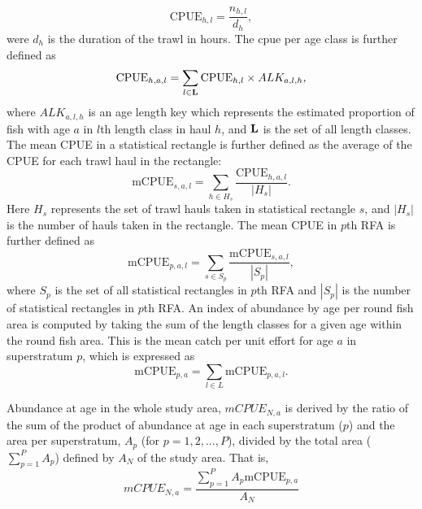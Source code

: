 \documentclass[a4paper 12pt]{article}
\numberwithin{equation}{section}
\begin{document}
\begin{equation}\label{eq:cpueHaul}
\mathrm{CPUE}_{h,l} =\frac{n_{h,l}}{d_h},
\end{equation}
were $d_h$ is the duration of the trawl in hours. The cpue per age class is further defined as
\begin{equation}\label{eq:cpueALK}
\mathrm{CPUE}_{h,a, l} =\sum_{l \in {\bf L}}\mathrm{CPUE}_{h, l} \times ALK_{a,l,h},
\end{equation}
where $ALK_{a,l,h}$ is an age length key which represents the estimated proportion of fish with age $a$ in $l$th length class in haul $h$, and ${\bf L}$ is the set of all length classes. The mean CPUE in a statistical rectangle is further defined as the average of the CPUE for each trawl haul in the rectangle:
\begin{equation}\label{eq:cpueRec}
\mathrm{mCPUE}_{s,a,l} =\sum_{h \in H_{s}}\frac{\mathrm{CPUE}_{h,a, l}}{|H_{s}|}.
\end{equation}
Here $H_{s}$ represents the set of trawl hauls taken in statistical rectangle $s$, and $|H_{s}|$ is the number of hauls taken in the rectangle. The mean CPUE in $p$th RFA is further defined as
\begin{equation}\label{eq:cpueRFA}
\mathrm{mCPUE}_{p,a,l} = \sum_{s \in S_{p}} \frac{\mathrm{mCPUE}_{s,a,l}}{|S_{p}|} ,
\end{equation}
where $S_{p}$ is the set of all statistical rectangles in $p$th RFA and $|S_{p}|$ is the number of statistical rectangles in $p$th RFA. An index of abundance by age per round fish area is computed by taking the sum of the length classes for a given age within the round fish area. This is the mean catch per unit effort for age $a$ in superstratum $p$, which is expressed as
\begin{equation}
\mathrm{mCPUE}_{p,a} =  \sum\limits_{l \in L} \mathrm{mCPUE}_{p,a,l}.
\label{eq:ageIndex}
\end{equation}

Abundance at age in the whole study area, $mCPUE_{N,a} $ is derived by the ratio of the sum of the product of abundance at age in each superstratum ($p$) and the area per superstratum, $A_{p}$ (for $p=1,2,...,P$), divided by the total area ($\sum_{p=1}^{P} A_{p}$) defined by $A_{N}$ of the study area. That is,
\begin{equation}
mCPUE_{N,a} = \frac{\sum_{p=1}^{P} A_{p}  \mathrm{mCPUE}_{p,a}}{A_{N}}
\label{abundanceestimatornorthsea}
\end{equation}
 
\end{document}
